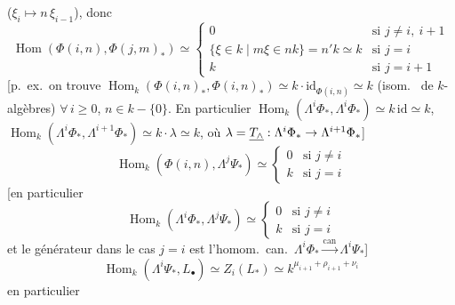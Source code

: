 \documentclass[11pt,a4paper]{article}
\begin{document}
($\xi_{i} \mapsto n\,\xi_{i-1}$), donc
\[
  \operatorname{Hom}(\Phi(i,n), \Phi(j,m)_{*}) \simeq
  \begin{cases}
    0 & \text{si } j \neq i,\ i+1 \\
    \{\xi \in k \mid m\xi \in nk\} = n'k \simeq k & \text{si } j = i \\
    k & \text{si } j = i+1
  \end{cases}
\]
 [p.\ ex.\
on trouve $\operatorname{Hom}_{k}(\Phi(i,n)_{*}, \Phi(i,n)_{*}) \simeq k
\cdot \mathrm{id}_{\Phi(i,n)} \simeq k$ (isom.\ \struck{\ill{}} de
$k$-algèbres) \ill{} $\forall\, i \geqslant 0$, $n \in k - \lbrace 0
\rbrace$. \struck{$\operatorname{Hom}(\Lambda^{i}\Phi, \Lambda^{i+1}\Phi)
\ldots$} En particulier
$\operatorname{Hom}_{k}(\Lambda^{i}\Phi_{*}, \Lambda^{i}\Phi_{*}) \simeq
k\, \mathrm{id} \simeq k$, $\operatorname{Hom}_{k}(\Lambda^{i}\Phi_{*},
\Lambda^{i+1}\Phi_{*}) \simeq k \cdot \lambda \simeq k$, où $\lambda =
\uncertain{T_{\wedge}} : \Lambda^{i}\Phi_{*} \to \Lambda^{i+1}\Phi_{*}$]
\[
  \operatorname{Hom}_{k}(\Phi(i,n), \Lambda^{j}\Psi_{*}) \simeq
  \begin{cases}
    0 & \text{si } j \neq i \\
    k & \text{si } j = i
  \end{cases}
\]
[en particulier
\[
  \operatorname{Hom}_{k}(\Lambda^{i}\Phi_{*}, \Lambda^{j}\Psi_{*}) \simeq
  \begin{cases}
    0 & \text{si } j \neq i \\
    k & \text{si } j = i
  \end{cases}
\]
et le générateur dans le cas $j = i$ est l'homom.\ can.\
$\Lambda^{i}\Phi_{*} \xrightarrow{\mathrm{can}} \Lambda^{i}\Psi_{*}$]
\[
  \operatorname{Hom}_{k}(\Lambda^{i}\Psi_{*}, L_{\bullet}) \simeq
  Z_{i}(L_{*}) \simeq k^{\mu_{i+1} + \rho_{i+1} + \nu_{i}}
\]
en particulier
\end{document}
